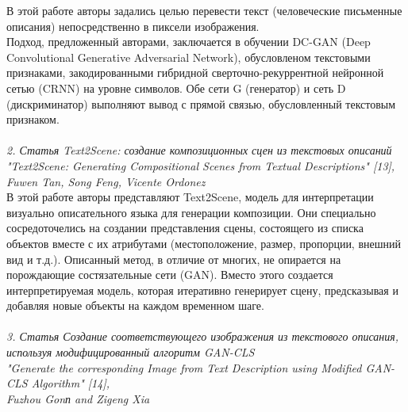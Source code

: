\documentclass{article}
\begin{document}
    В этой работе авторы задались целью перевести текст (человеческие письменные описания) непосредственно в пиксели изображения.
    \\
    Подход, предложенный авторами, заключается в обучении DC-GAN (Deep Convolutional Generative Adversarial Network), обусловленом текстовыми признаками, закодированными гибридной сверточно-рекуррентной нейронной сетью (CRNN) на уровне символов. Обе сети G (генератор) и сеть D (дискриминатор) выполняют вывод с прямой связью, обусловленный текстовым признаком.
    \\ \\
    \textit{2. Статья Text2Scene: создание композиционных сцен из текстовых описаний
    \\
    "Text2Scene: Generating Compositional Scenes from Textual Descriptions" [13], 
    \\
    Fuwen Tan, Song Feng, Vicente Ordonez}
    \\

    В этой работе авторы представляют Text2Scene, модель для интерпретации визуально описательного языка для генерации композиции. Они специально сосредоточелись на создании представления сцены, состоящего из списка объектов вместе с их атрибутами (местоположение, размер, пропорции, внешний вид и т.д.). Описанный метод, в отличие от многих, не опирается на порождающие состязательные сети (GAN). Вместо этого создается интерпретируемая модель, которая итеративно генерирует сцену, предсказывая и добавляя новые объекты на каждом временном шаге.
    \\ \\
    \textit{3. Статья Создание соответствующего изображения из текстового описания, используя модифицированный алгоритм GAN-CLS
    \\
    "Generate the corresponding Image from Text Description using Modified GAN-CLS Algorithm" [14], 
    \\
    Fuzhou Gonп and Zigeng Xia}
    \\
\end{document}
